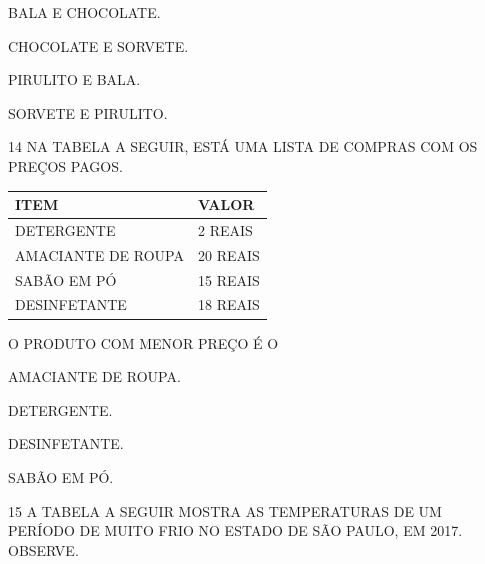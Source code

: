 \begin{multicols}{2}
\begin{escolha}[itemsep=0pt]
\item BALA E CHOCOLATE.

\item CHOCOLATE E SORVETE.

\item PIRULITO E BALA.

\item SORVETE E PIRULITO.
\end{escolha}
\end{multicols}

\num{14} NA TABELA A SEGUIR, ESTÁ UMA LISTA DE COMPRAS COM OS PREÇOS PAGOS.

\begin{table}[!ht]
    \centering
    \begin{tabular}{|l|l|}
    \hline
        \textbf{ITEM} & \textbf{VALOR} \\ \hline
        DETERGENTE & 2 REAIS \\ \hline
        AMACIANTE DE ROUPA & 20 REAIS \\ \hline
        SABÃO EM PÓ & 15 REAIS \\ \hline
        DESINFETANTE & 18 REAIS \\ \hline
    \end{tabular}
\end{table}


O PRODUTO COM MENOR PREÇO É O

\begin{multicols}{2}
\begin{escolha}[itemsep=0pt]
\item AMACIANTE DE ROUPA.

\item DETERGENTE.

\item DESINFETANTE.

\item SABÃO EM PÓ.
\end{escolha}
\end{multicols}

\pagebreak
\num{15} A TABELA A SEGUIR MOSTRA AS TEMPERATURAS DE UM PERÍODO DE MUITO FRIO NO ESTADO DE SÃO
PAULO, EM 2017. OBSERVE.

